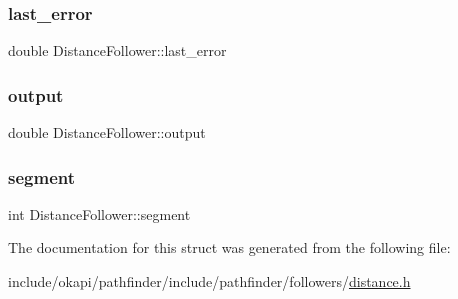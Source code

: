 \mbox{\label{structDistanceFollower_a39217b0b0d11fac687ef1f7184e1662f}} 
\subsubsection{\texorpdfstring{last\_error}{last\_error}}
{\footnotesize\ttfamily double Distance\+Follower\+::last\+\_\+error}

\mbox{\label{structDistanceFollower_ad45bcee91b5002738222ba423ed34ec5}} 
\subsubsection{\texorpdfstring{output}{output}}
{\footnotesize\ttfamily double Distance\+Follower\+::output}

\mbox{\label{structDistanceFollower_a47cfca5fa21eb4a7e3357900ff3f42e9}} 
\subsubsection{\texorpdfstring{segment}{segment}}
{\footnotesize\ttfamily int Distance\+Follower\+::segment}



The documentation for this struct was generated from the following file\+:\begin{DoxyCompactItemize}
\item 
include/okapi/pathfinder/include/pathfinder/followers/\mbox{\hyperlink{distance_8h}{distance.\+h}}\end{DoxyCompactItemize}

